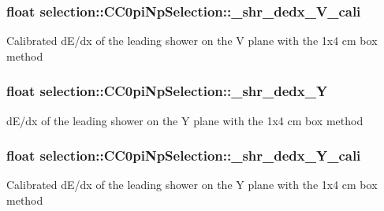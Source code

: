 \subsubsection[{\texorpdfstring{\+\_\+shr\+\_\+dedx\+\_\+\+V\+\_\+cali}{_shr_dedx_V_cali}}]{\setlength{\rightskip}{0pt plus 5cm}float selection\+::\+C\+C0pi\+Np\+Selection\+::\+\_\+shr\+\_\+dedx\+\_\+\+V\+\_\+cali\hspace{0.3cm}{\ttfamily [private]}}\hypertarget{classselection_1_1CC0piNpSelection_a0ef852fb0ecd8a3b6f871ed765be12da}{}\label{classselection_1_1CC0piNpSelection_a0ef852fb0ecd8a3b6f871ed765be12da}
Calibrated d\+E/dx of the leading shower on the V plane with the 1x4 cm box method 
\subsubsection[{\texorpdfstring{\+\_\+shr\+\_\+dedx\+\_\+Y}{_shr_dedx_Y}}]{\setlength{\rightskip}{0pt plus 5cm}float selection\+::\+C\+C0pi\+Np\+Selection\+::\+\_\+shr\+\_\+dedx\+\_\+Y\hspace{0.3cm}{\ttfamily [private]}}\hypertarget{classselection_1_1CC0piNpSelection_a1af96c31bd3afe4b111f429927bbff1c}{}\label{classselection_1_1CC0piNpSelection_a1af96c31bd3afe4b111f429927bbff1c}
d\+E/dx of the leading shower on the Y plane with the 1x4 cm box method 
\subsubsection[{\texorpdfstring{\+\_\+shr\+\_\+dedx\+\_\+\+Y\+\_\+cali}{_shr_dedx_Y_cali}}]{\setlength{\rightskip}{0pt plus 5cm}float selection\+::\+C\+C0pi\+Np\+Selection\+::\+\_\+shr\+\_\+dedx\+\_\+\+Y\+\_\+cali\hspace{0.3cm}{\ttfamily [private]}}\hypertarget{classselection_1_1CC0piNpSelection_a114f4276a8931d33d8f77fede58398fa}{}\label{classselection_1_1CC0piNpSelection_a114f4276a8931d33d8f77fede58398fa}
Calibrated d\+E/dx of the leading shower on the Y plane with the 1x4 cm box method 
